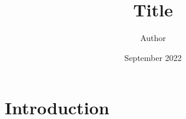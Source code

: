 \documentclass{article}
\title{Title}
\author{Author}
\date{September 2022}
\begin{document}
\maketitle

\newpage

\section{Introduction}
\end{document}
